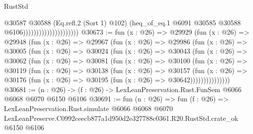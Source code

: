 \begin{lexlean}{RustStd}
\begin{coremodule}
                                          @30587
                                            @30588
                                            (Eq.refl.{2} (Sort 1) @102)
                                            (heq_of_eq.{1}
                                              @6091
                                              @30585
                                              @30588
                                              @6106)))))))))))))))))))))
@30673 := fun (x : @26) =>
  @29929
    (fun (x : @26) =>
    @29948
      (fun (x : @26) =>
      @29967
        (fun (x : @26) =>
        @29986
          (fun (x : @26) =>
          @30005
            (fun (x : @26) =>
            @30024
              (fun (x : @26) =>
              @30043
                (fun (x : @26) =>
                @30062
                  (fun (x : @26) =>
                  @30081
                    (fun (x : @26) =>
                    @30100
                      (fun (x : @26) =>
                      @30119
                        (fun (x : @26) =>
                        @30138
                          (fun (x : @26) =>
                          @30157
                            (fun (x : @26) =>
                            @30176 (fun (x : @26) => @30195 (fun (x : @26) => @30642)))))))))))))))
@30681 := (n : @26) -> (f : @26) -> LexLeanPreservation.Rust.FunSem @6066 @6068 @6070 @6150 @6106
@30691 := fun (n : @26) =>
  fun (f : @26) =>
  LexLeanPreservation.Rust.simulate
    @6066
    @6068
    @6070
    LexLeanPreserve.C0992ceecb877a1d950d2e327788c0361.R20.RustStd.crate_ok
    @6150
    @6106
\end{coremodule}
\end{lexlean}
